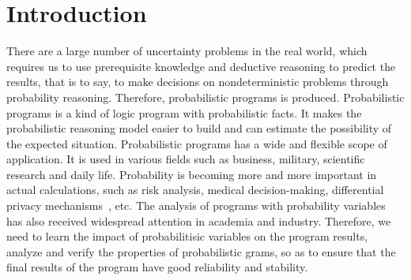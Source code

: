 \section{Introduction}
There are a large number of uncertainty problems in the real world, which requires us to use prerequisite knowledge and deductive reasoning to predict the results, that is to say, to make decisions on nondeterministic problems through probability reasoning. Therefore, probabilistic programs is produced. Probabilistic programs is a kind of logic program with probabilistic facts. It makes the probabilistic reasoning model easier to build and can estimate the possibility of the expected situation.
Probabilistic programs has a wide and flexible scope of application. It is used in various fields such as business, military, scientific research and daily life. Probability is becoming more and more important in actual calculations, such as risk analysis, medical decision-making, differential privacy mechanisms~\cite{Dwork2014Differential}, etc. The analysis of programs with probability variables has also received widespread attention in academia and industry. Therefore, we need to learn the impact of probabilitisic variables on the program results, analyze and verify the properties of probabilistic grams, so as to ensure that the final results of the program have good reliability and stability.

